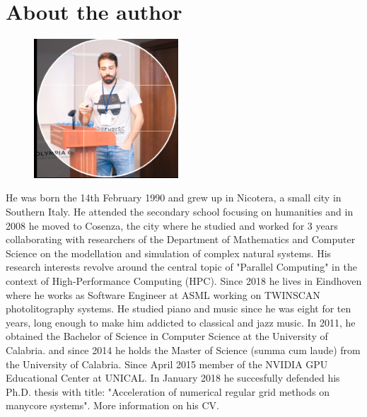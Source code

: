 \chapter*{About the author}

\begin{figure}
    \vspace{-20pt}
    \begin{center}
        \includegraphics[width=0.48\textwidth]{images/me_linkedin}
    \end{center}
    \vspace{-15pt}
  \end{figure}

He was born the 14th February 1990 and grew up in Nicotera, a small city in Southern Italy. He attended the secondary school focusing on humanities and in 2008 he moved to Cosenza, the city where  he studied and worked for 3 years collaborating with researchers of the Department of Mathematics and Computer Science on the modellation and simulation of complex natural systems. His research interests revolve around the central topic of "Parallel Computing" in the context of High-Performance Computing (HPC). Since 2018 he lives in Eindhoven where he works as Software Engineer at ASML working on TWINSCAN photolitography systems. He studied piano and music since he was eight for ten years, long enough to make him addicted to classical and jazz music. In 2011, he obtained the Bachelor of Science in Computer Science at the University of Calabria. and since 2014 he holds the Master of Science (summa cum laude) from the University of Calabria. Since April 2015 member of the NVIDIA GPU Educational Center at UNICAL.  In  January 2018 he succesfully defended his Ph.D. thesis with title: "Acceleration of numerical regular grid methods on manycore systems".  More information on his CV.


